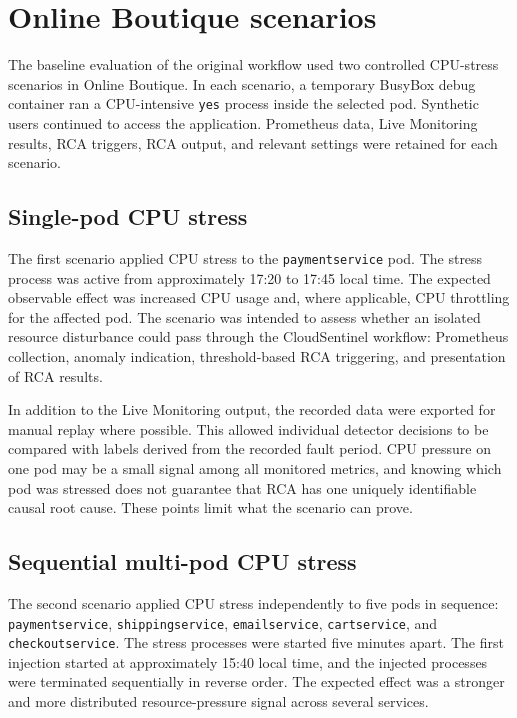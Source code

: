 \section{Online Boutique scenarios}
The baseline evaluation of the original workflow used two controlled CPU-stress scenarios in Online Boutique. In each scenario, a temporary BusyBox debug container ran a CPU-intensive \texttt{yes} process inside the selected pod. Synthetic users continued to access the application. Prometheus data, Live Monitoring results, RCA triggers, RCA output, and relevant settings were retained for each scenario.

\subsection{Single-pod CPU stress}
The first scenario applied CPU stress to the \texttt{paymentservice} pod. The stress process was active from approximately 17:20 to 17:45 local time. The expected observable effect was increased CPU usage and, where applicable, CPU throttling for the affected pod. The scenario was intended to assess whether an isolated resource disturbance could pass through the CloudSentinel workflow: Prometheus collection, anomaly indication, threshold-based RCA triggering, and presentation of RCA results.

In addition to the Live Monitoring output, the recorded data were exported for manual replay where possible. This allowed individual detector decisions to be compared with labels derived from the recorded fault period. CPU pressure on one pod may be a small signal among all monitored metrics, and knowing which pod was stressed does not guarantee that RCA has one uniquely identifiable causal root cause. These points limit what the scenario can prove.

\subsection{Sequential multi-pod CPU stress}
The second scenario applied CPU stress independently to five pods in sequence: \texttt{paymentservice}, \texttt{shippingservice}, \texttt{emailservice}, \texttt{cartservice}, and \texttt{checkoutservice}. The stress processes were started five minutes apart. The first injection started at approximately 15:40 local time, and the injected processes were terminated sequentially in reverse order. The expected effect was a stronger and more distributed resource-pressure signal across several services.

